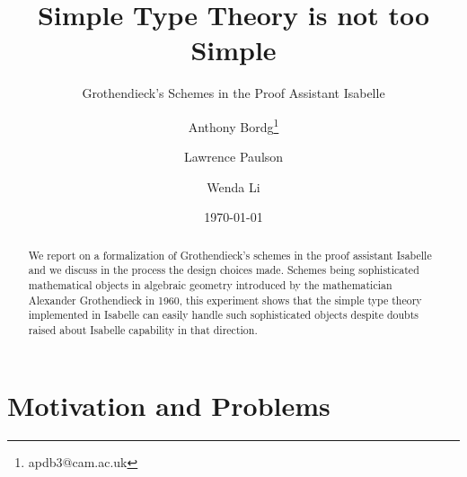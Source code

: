 \documentclass[12pt]{scrartcl}
\begin{document}
\title{Simple Type Theory is not too Simple}
\subtitle{Grothendieck's Schemes in the Proof Assistant Isabelle}
\author{Anthony Bordg\thanks{apdb3@cam.ac.uk} \and Lawrence Paulson \and Wenda Li}
\date\today 
\maketitle

\begin{abstract}
 	We report on a formalization of Grothendieck's schemes in the proof assistant Isabelle and we discuss in the process the design choices made. Schemes being sophisticated mathematical objects in algebraic geometry introduced by the mathematician Alexander Grothendieck in 1960, this experiment shows that the simple type theory implemented in Isabelle can easily handle such sophisticated objects despite doubts raised about Isabelle capability in that direction.   
\end{abstract}

\section{Motivation and Problems}
\label{sec:intro}
\end{document}
